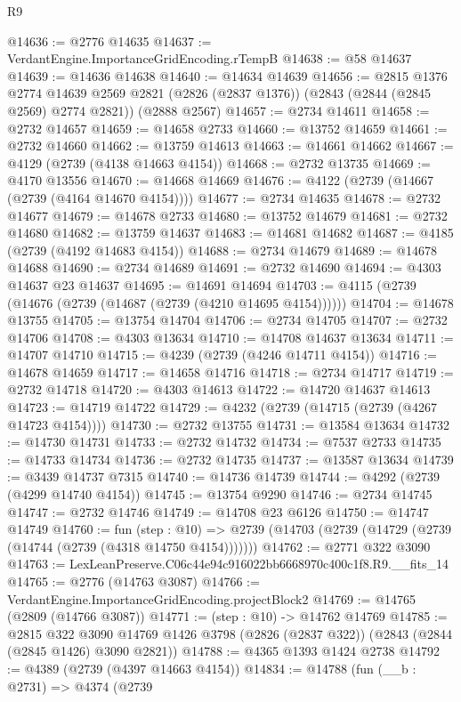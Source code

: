 \begin{lexlean}{R9}
\begin{coremodule}
@14636 := @2776 @14635
@14637 := VerdantEngine.ImportanceGridEncoding.rTempB
@14638 := @58 @14637
@14639 := @14636 @14638
@14640 := @14634 @14639
@14656 := @2815
    @1376
    @2774
    @14639
    @2569
    @2821
    (@2826 (@2837 @1376))
    (@2843 (@2844 (@2845 @2569) @2774 @2821))
    (@2888 @2567)
@14657 := @2734 @14611
@14658 := @2732 @14657
@14659 := @14658 @2733
@14660 := @13752 @14659
@14661 := @2732 @14660
@14662 := @13759 @14613
@14663 := @14661 @14662
@14667 := @4129 (@2739 (@4138 @14663 @4154))
@14668 := @2732 @13735
@14669 := @4170 @13556
@14670 := @14668 @14669
@14676 := @4122 (@2739 (@14667 (@2739 (@4164 @14670 @4154))))
@14677 := @2734 @14635
@14678 := @2732 @14677
@14679 := @14678 @2733
@14680 := @13752 @14679
@14681 := @2732 @14680
@14682 := @13759 @14637
@14683 := @14681 @14682
@14687 := @4185 (@2739 (@4192 @14683 @4154))
@14688 := @2734 @14679
@14689 := @14678 @14688
@14690 := @2734 @14689
@14691 := @2732 @14690
@14694 := @4303 @14637 @23 @14637
@14695 := @14691 @14694
@14703 := @4115 (@2739 (@14676 (@2739 (@14687 (@2739 (@4210 @14695 @4154))))))
@14704 := @14678 @13755
@14705 := @13754 @14704
@14706 := @2734 @14705
@14707 := @2732 @14706
@14708 := @4303 @13634
@14710 := @14708 @14637 @13634
@14711 := @14707 @14710
@14715 := @4239 (@2739 (@4246 @14711 @4154))
@14716 := @14678 @14659
@14717 := @14658 @14716
@14718 := @2734 @14717
@14719 := @2732 @14718
@14720 := @4303 @14613
@14722 := @14720 @14637 @14613
@14723 := @14719 @14722
@14729 := @4232 (@2739 (@14715 (@2739 (@4267 @14723 @4154))))
@14730 := @2732 @13755
@14731 := @13584 @13634
@14732 := @14730 @14731
@14733 := @2732 @14732
@14734 := @7537 @2733
@14735 := @14733 @14734
@14736 := @2732 @14735
@14737 := @13587 @13634
@14739 := @3439 @14737 @7315
@14740 := @14736 @14739
@14744 := @4292 (@2739 (@4299 @14740 @4154))
@14745 := @13754 @9290
@14746 := @2734 @14745
@14747 := @2732 @14746
@14749 := @14708 @23 @6126
@14750 := @14747 @14749
@14760 := fun (step : @10) =>
  @2739 (@14703 (@2739 (@14729 (@2739 (@14744 (@2739 (@4318 @14750 @4154)))))))
@14762 := @2771 @322 @3090
@14763 := LexLeanPreserve.C06c44e94c916022bb6668970c400c1f8.R9.__fits_14
@14765 := @2776 (@14763 @3087)
@14766 := VerdantEngine.ImportanceGridEncoding.projectBlock2
@14769 := @14765 (@2809 (@14766 @3087))
@14771 := (step : @10) -> @14762 @14769
@14785 := @2815
    @322
    @3090
    @14769
    @1426
    @3798
    (@2826 (@2837 @322))
    (@2843 (@2844 (@2845 @1426) @3090 @2821))
@14788 := @4365 @1393 @1424 @2738
@14792 := @4389 (@2739 (@4397 @14663 @4154))
@14834 := @14788
    (fun (__b : @2731) =>
    @4374
      (@2739

\end{coremodule}
\end{lexlean}

